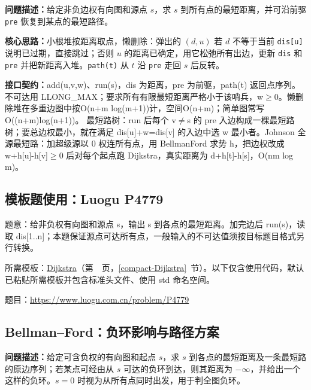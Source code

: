 \noindent\textbf{问题描述：}\allowbreak 给定非负边权有向图和源点 $s$，求 $s$ 到所有点的最短距离，并可沿前驱 \texttt{pre} 恢复到某点的最短路径。

\textbf{核心思路：}\allowbreak 小根堆按距离取点，懒删除：弹出的 $(d,u)$ 若 $d$ 不等于当前 \texttt{dis[u]} 说明已过期，直接跳过；否则 $u$ 的距离已确定，用它松弛所有出边，更新 \texttt{dis} 和 \texttt{pre} 并把新距离入堆。\texttt{path(t)} 从 $t$ 沿 \texttt{pre} 走回 $s$ 后反转。



{\sloppy{}\noindent\textbf{接口契约：}add(u,v,w)、run(s)，dis 为距离，pre 为前驱，path(t) 返回点序列。不可达用 LLONG\_MAX；要求所有有限最短距离严格小于该哨兵，w$\ge$0。懒删除堆在多重边图中按O(n+m log(m+1))计，空间O(n+m)；简单图常写O((n+m)log(n+1))。 最短路树：run 后每个 v$\ne$s 的 pre 入边构成一棵最短路树；要总边权最小，就在满足 dis[u]+w=dis[v] 的入边中选 w 最小者。Johnson 全源最短路：加超级源以 0 权连所有点，用 BellmanFord 求势 h，把边权改成 w+h[u]-h[v]$\ge$0 后对每个起点跑 Dijkstra，真实距离为 d+h[t]-h[s]，O(nm log m)。\par}



\Needspace{356pt}

\subsection*{模板题使用：Luogu P4779}

\label{usage-example-59}

题意：给非负权有向图和源点 s，输出 s 到各点的最短距离。加完边后 run(s)，读取 dis[1..n]；本题保证源点可达所有点，一般输入的不可达值须按目标题目格式另行转换。

所需模板：\hyperref[compact-Dijkstra]{Dijkstra}（第~\pageref{compact-Dijkstra}~页，\ref{compact-Dijkstra}~节）。以下仅含使用代码，默认已粘贴所需模板并包含标准头文件、使用 std 命名空间。

题目：\url{https://www.luogu.com.cn/problem/P4779}



\subsection{Bellman--Ford：负环影响与路径方案}\label{compact-BellmanFord}

\noindent\textbf{问题描述：}\allowbreak 给定可含负权的有向图和起点 $s$，求 $s$ 到各点的最短距离及一条最短路的原边序列；若某点可经由从 $s$ 可达的负环到达，则其距离为 $-\infty$，并给出一个这样的负环。$s=0$ 时视为从所有点同时出发，用于判全图负环。

